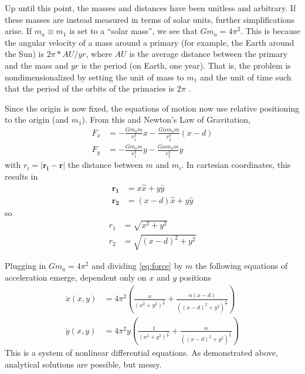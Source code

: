 \documentclass[preprint,titlepage,preprintnumbers,amsmath,amssymb,aps,11pt]{revtex4-2}
\begin{document}
Up until this point, the masses and distances have been unitless and arbitrary. If these masses are instead measured in terms of solar units, further simplifications arise. If $m_a\equiv m_1$ is set to a “solar mass”, we see that $Gm_a=4\pi^2$. This is because the angular velocity of a mass around a primary (for example, the Earth around the Sun) is $2\pi*AU/yr$, where $AU$ is the average distance between the primary and the mass and $yr$ is the period (on Earth, one year). That is, the problem is nondimensionalized by setting the unit of mass to $m_1$ and the unit of time such that the period of the orbits of the primaries is $2\pi$ \cite{Wild1980,Worthington2012}.

Since the origin is now fixed, the equations of motion now use relative positioning to the origin (and $m_1$). From this and Newton's Law of Gravitation,
\begin{equation}
    \begin{aligned}
        F_x & =-\frac{Gm_a m}{r_1^3}x-\frac{G\alpha m_a m}{r_2^3}(x-d) \\
        F_y & =-\frac{Gm_a m}{r_1^3}y-\frac{G\alpha m_a m}{r_2^3}y
    \end{aligned}
    \label{eq:force}
\end{equation}
with $r_i=|\bm{r_i}-\bm{r}|$ the distance between $m$ and $m_i$. In cartesian coordinates, this results in
\begin{equation}
    \begin{aligned}
        \bm{r_1} & =x\hat{x}+y\hat{y}     \\
        \bm{r_2} & =(x-d)\hat{x}+y\hat{y}
    \end{aligned}
\end{equation}
so
\begin{equation}
    \begin{aligned}
        r_1 & =\sqrt{x^2+y^2}     \\
        r_2 & =\sqrt{(x-d)^2+y^2}
    \end{aligned}
\end{equation}

Plugging in $Gm_a=4\pi^2$ and dividing \ref{eq:force} by $m$ the following equations of acceleration emerge, dependent only on $x$ and $y$ positions
\begin{equation}
    \begin{aligned}
        \ddot{x}(x,y) & = 4\pi^2(\frac{x}{(x^2+y^2)^{\frac{3}{2}}}+\frac{\alpha(x-d)}{((x-d)^2+y^2)^{\frac{3}{2}}}) \\
        \ddot{y}(x,y) & = 4\pi^2y(\frac{1}{(x^2+y^2)^{\frac{3}{2}}}+\frac{\alpha}{((x-d)^2+y^2)^{\frac{3}{2}}})
    \end{aligned}
\end{equation}
This is a system of nonlinear differential equations. As demonstrated above, analytical solutions are possible, but messy.
\end{document}
